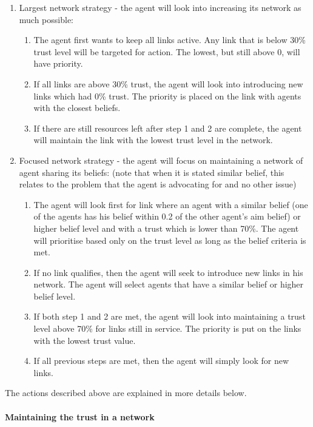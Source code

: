 \begin{enumerate}
\item Largest network strategy - the agent will look into increasing its network as much possible:
	\begin{enumerate}
	\item The agent first wants to keep all links active. Any link that is below 30\% trust level will be targeted for action. The lowest, but still above 0, will have priority.
	\item If all links are above 30\% trust, the agent will look into introducing new links which had 0\% trust. The priority is placed on the link with agents with the closest beliefs.
	\item If there are still resources left after step 1 and 2 are complete, the agent will maintain the link with the lowest trust level in the network.
	\end{enumerate}
\item Focused network strategy - the agent will focus on maintaining a network of agent sharing its beliefs: (note that when it is stated similar belief, this relates to the problem that the agent is advocating for and no other issue)
	\begin{enumerate}
	\item The agent will look first for link where an agent with a similar belief (one of the agents has his belief within 0.2 of the other agent's aim belief) or higher belief level and with a trust which is lower than 70\%. The agent will prioritise based only on the trust level as long as the belief criteria is met.
	\item If no link qualifies, then the agent will seek to introduce new links in his network. The agent will select agents that have a similar belief or higher belief level.
	\item If both step 1 and 2 are met, the agent will look into maintaining a trust level above 70\% for links still in service. The priority is put on the links with the lowest trust value.
	\item If all previous steps are met, then the agent will simply look for new links.
	\end{enumerate}
\end{enumerate}

The actions described above are explained in more details below.

\paragraph{Maintaining the trust in a network}

